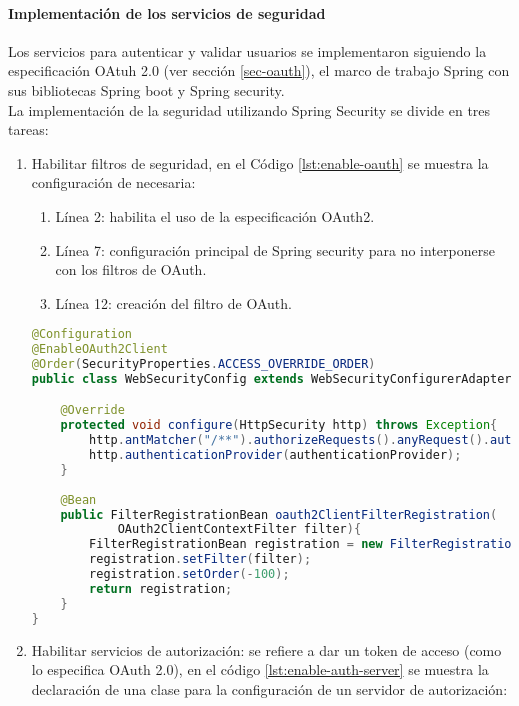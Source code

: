 \paragraph{Implementación de los servicios de seguridad\\}
Los servicios para autenticar y validar usuarios se implementaron siguiendo la especificación OAtuh 2.0 (ver sección \ref{sec-oauth}), el marco de trabajo Spring con sus bibliotecas Spring boot y Spring security.\\
La implementación de la seguridad utilizando Spring Security se divide en tres tareas:
\begin{enumerate}
	\item Habilitar filtros de seguridad, en el Código \ref{lst:enable-oauth} se muestra la configuración de necesaria:
	\begin{enumerate}
		\item Línea 2: habilita el uso de la especificación OAuth2.
		\item Línea 7: configuración principal de Spring security para no interponerse con los filtros de OAuth.
		\item Línea 12: creación del filtro de OAuth.
	\end{enumerate}
\begin{lstlisting}[language=Java, caption={Clase para habilitar los filtros de seguridad.}, captionpos=b, label={lst:enable-oauth}]
@Configuration
@EnableOAuth2Client
@Order(SecurityProperties.ACCESS_OVERRIDE_ORDER)
public class WebSecurityConfig extends WebSecurityConfigurerAdapter{

	@Override
	protected void configure(HttpSecurity http) throws Exception{
		http.antMatcher("/**").authorizeRequests().anyRequest().authenticated().and().logout().logoutSuccessUrl("/").permitAll().and().sessionManagement().sessionCreationPolicy(SessionCreationPolicy.STATELESS).and().csrf().disable();
		http.authenticationProvider(authenticationProvider);
	}
	
	@Bean
	public FilterRegistrationBean oauth2ClientFilterRegistration(
			OAuth2ClientContextFilter filter){
		FilterRegistrationBean registration = new FilterRegistrationBean();
		registration.setFilter(filter);
		registration.setOrder(-100);
		return registration;
	}
}	
\end{lstlisting}

	\item Habilitar servicios de autorización: se refiere a dar un token de acceso (como lo especifica OAuth 2.0), en el código \ref{lst:enable-auth-server} se muestra la declaración de una clase para la configuración de un servidor de autorización:


\end{enumerate}
